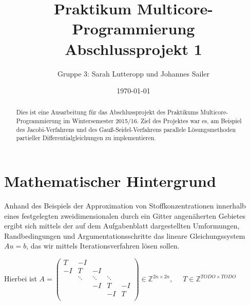 \documentclass{article}
\title{Praktikum Multicore-Programmierung \\ Abschlussprojekt 1}
\author{Gruppe 3: Sarah Lutteropp und Johannes Sailer}
\date{\today}
\begin{document}
\maketitle


\begin{abstract}
Dies ist eine Ausarbeitung für das Abschlussprojekt des Praktikums Multicore-Programmierung im Wintersemester 2015/16. Ziel des Projektes war es, am Beispiel des Jacobi-Verfahrens und des Gauß-Seidel-Verfahrens parallele Lösungsmethoden partieller Differentialgleichungen zu implementieren.
\end{abstract}

\section{Mathematischer Hintergrund}

%	

Anhand des Beispiels der Approximation von Stoffkonzentrationen innerhalb eines festgelegten zweidimensionalen durch ein Gitter angenäherten Gebietes ergibt sich mittels der auf dem Aufgabenblatt dargestellten Umformungen, Randbedingungen und Argumentationsschritte das lineare Gleichungssystem $Au = b$, das wir mittels Iterationsverfahren lösen sollen.

Hierbei ist
$A = \begin{pmatrix}
T & -I &  &  &  \\ 
-I & T & -I &  &  \\ 
 & \ddots & \ddots & \ddots &  \\ 
 &  & -I & T & -I \\ 
 &  &  & -I & T \\ 
\end{pmatrix} \in \mathbb{Z}^{2n \times 2n}, \quad$
$T \in \mathbb{Z}^{TODO \times TODO}$ 
\end{document}
